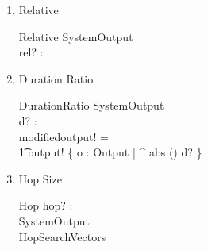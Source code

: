 \documentclass[11pt]{article}
\begin{document}
\begin{enumerate}
\begin{enumerate}
\item Relative




\begin{schema}{Relative}
	SystemOutput \\
	rel? : \R \\
\end{schema}	

\item Duration Ratio

\begin{schema}{DurationRatio}
	SystemOutput \\
	d? : \R \\
\where
	modifiedoutput! = \\
	\t1 output! \filter \{ o : Output | \exp ^ {abs \ln ()} \leq d?  \} 
\end{schema}	

\item Hop Size 

\begin{schema}{Hop}
	hop? : \nat \\
	SystemOutput \\
	HopSearchVectors \\
\end{schema}

\end{enumerate}
\end{enumerate}
\end{document}
